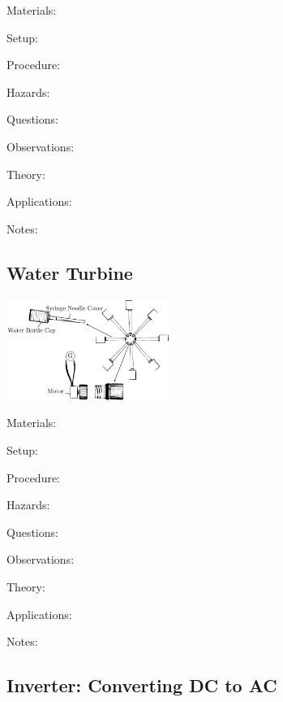 \begin{multicols}{2}
\begin{description*}
\item[Materials:]{}
\item[Setup:]{}
\item[Procedure:]{}
\item[Hazards:]{}
\item[Questions:]{}
\item[Observations:]{}
\item[Theory:]{}
\item[Applications:]{}
\item[Notes:]{}
\end{description*}

\subsection{Water Turbine}

\begin{center}
\includegraphics[width=0.4\textwidth]{./img/water-turbine.png}
\end{center}

\begin{description*}
\item[Materials:]{}
\item[Setup:]{}
\item[Procedure:]{}
\item[Hazards:]{}
\item[Questions:]{}
\item[Observations:]{}
\item[Theory:]{}
\item[Applications:]{}
\item[Notes:]{}
\end{description*}

\subsection{Inverter: Converting DC to AC}


\end{multicols}
